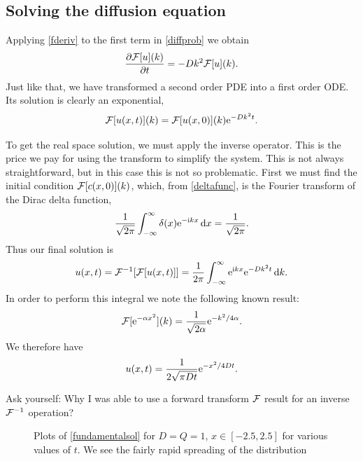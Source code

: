 \documentclass[main.tex]{subfiles}
\begin{document}
\subsection{Solving the diffusion equation}
Applying \cref{fderiv} to the first term in \cref{diffprob} we obtain 
\begin{equation}
\pd{\Four [u](k)}{t} = -Dk^2\Four [u](k).
\end{equation}
Just like that, we have transformed a second order PDE into a first order ODE. Its solution is clearly an exponential,
\begin{equation}
\mathcal{F}[u(x,t)](k) = \mathcal{F}[u(x,0)](k)\mathrm{e}^{-D k^2 t}. 
\end{equation}

To get the real space solution, we must apply the inverse operator. This is the price we pay for using the transform to simplify the system. This is not always straightforward, but in this case this is not so problematic. First we must find the initial condition $ \mathcal{F}[c(x,0)](k)$, which, from \cref{deltafunc}, is the Fourier transform of the Dirac delta function,
\begin{equation}
\frac{1}{\sqrt{2\pi}}\int_{-\infty}^{\infty}\delta(x)\mathrm{e}^{-\mathrm{i} kx}\,\mathrm{d}x = \frac{1}{\sqrt{2\pi}}.
\end{equation}
Thus our final solution is 
\begin{equation}
u(x,t) = \mathcal{F}^{-1}[\mathcal{F}[u(x,t)]] = \frac{1}{2\pi}\int_{-\infty}^{\infty}\mathrm{e}^{\mathrm{i} kx}\mathrm{e}^{-D k^2 t}\,\mathrm{d}{k}.
\end{equation}
In order to perform this integral we note the following known result:
\begin{equation}
\mathcal{F}[\mathrm{e}^{-\alpha x^2}](k) = \frac{1}{\sqrt{2\alpha}}\mathrm{e}^{-k^2/4\alpha}.
\end{equation}
We therefore have 
\begin{equation}
\label{fundamentalsol}
u(x,t) = \frac{1}{2 \sqrt{\pi Dt}} \mathrm{e}^{-x^2/4Dt}.
\end{equation}
\begin{do-it-yourself}
Ask yourself: Why I was able to use a forward transform $\mathcal{F}$ result for an inverse $\mathcal{F}^{-1}$ operation? \hfill {}
\end{do-it-yourself}
\begin{figure}
\begin{center}

\end{center}
\caption{Plots of \cref{fundamentalsol} for $D=Q=1$, $x\in[-2.5,2.5]$ for various values of $t$. We see the fairly rapid spreading of the distribution}
\label{funsol}
\end{figure}
\end{document}

